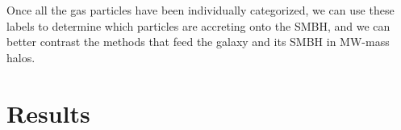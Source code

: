 \documentclass[manuscript]{aastex}
\begin{document}
Once all the gas particles have been individually categorized, we can use these labels to determine which particles are accreting onto the SMBH, and we can better contrast the methods that feed the galaxy and its SMBH in MW-mass halos.




\section{Results} \label{results}


\end{document}
